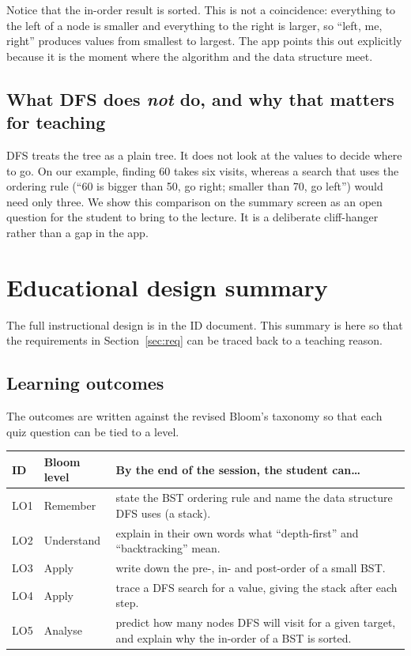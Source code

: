 \documentclass[11pt,a4paper]{article}
\begin{document}
Notice that the in-order result is sorted. This is not a coincidence: everything to the left of a
node is smaller and everything to the right is larger, so ``left, me, right'' produces values from
smallest to largest. The app points this out explicitly because it is the moment where the
algorithm and the data structure meet.

\subsection{What DFS does \emph{not} do, and why that matters for teaching}

DFS treats the tree as a plain tree. It does not look at the values to decide where to go. On our
example, finding 60 takes six visits, whereas a search that uses the ordering rule (``60 is bigger
than 50, go right; smaller than 70, go left'') would need only three. We show this comparison on the
summary screen as an open question for the student to bring to the lecture. It is a deliberate
cliff-hanger rather than a gap in the app.

\section{Educational design summary}
\label{sec:edu}

The full instructional design is in the ID document. This summary is here so that the
requirements in Section~\ref{sec:req} can be traced back to a teaching reason.

\subsection{Learning outcomes}

The outcomes are written against the revised Bloom's taxonomy \cite{anderson2001} so that each
quiz question can be tied to a level.

\begin{tabularx}{\textwidth}{@{}l l L@{}}
  \toprule
  \textbf{ID} & \textbf{Bloom level} & \textbf{By the end of the session, the student can\ldots} \\
  \midrule
  LO1 & Remember   & state the BST ordering rule and name the data structure DFS uses (a stack). \\
  LO2 & Understand & explain in their own words what ``depth-first'' and ``backtracking'' mean. \\
  LO3 & Apply      & write down the pre-, in- and post-order of a small BST. \\
  LO4 & Apply      & trace a DFS search for a value, giving the stack after each step. \\
  LO5 & Analyse    & predict how many nodes DFS will visit for a given target, and explain why
                     the in-order of a BST is sorted. \\
  \bottomrule
\end{tabularx}
\end{document}
